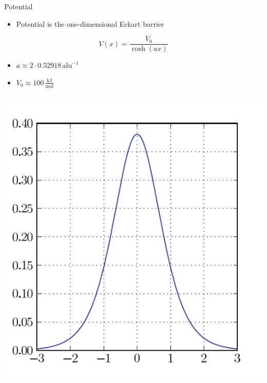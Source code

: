 \documentclass{beamer}
\begin{document}
\begin{frame}{Potential}
  \begin{itemize}
    \item Potential is the one-dimensional Eckart barrier
  \end{itemize}

  \begin{equation*}
    V(x) = \frac{V_0}{\cosh\left(a x\right)}
  \end{equation*}
  \begin{itemize}
    \item $a \approx 2 \cdot 0.52918 \, \text{alu}^{-1}$
    \item $V_0 \approx 100 \, \frac{\text{kJ}}{\text{mol}}$
  \end{itemize}
  \begin{center}
    \includegraphics[scale=0.4]{./fig/eckart.pdf}
  \end{center}
\end{frame}
\end{document}

